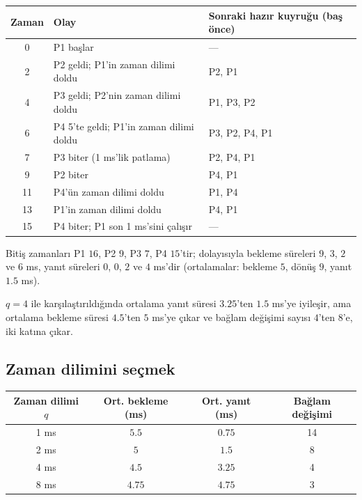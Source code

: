 \begin{center}
\renewcommand{\arraystretch}{1.15}
\begin{tabular}{@{}cll@{}}
\toprule
\textbf{Zaman} & \textbf{Olay} & \textbf{Sonraki hazır kuyruğu (baş önce)}\\
\midrule
0 & P1 başlar & --- \\
2 & P2 geldi; P1'in zaman dilimi doldu & P2, P1 \\
4 & P3 geldi; P2'nin zaman dilimi doldu & P1, P3, P2 \\
6 & P4 5'te geldi; P1'in zaman dilimi doldu & P3, P2, P4, P1 \\
7 & P3 biter (1 ms'lik patlama) & P2, P4, P1 \\
9 & P2 biter & P4, P1 \\
11 & P4'ün zaman dilimi doldu & P1, P4 \\
13 & P1'in zaman dilimi doldu & P4, P1 \\
15 & P4 biter; P1 son 1 ms'sini çalışır & --- \\
\bottomrule
\end{tabular}
\end{center}

Bitiş zamanları P1 $16$, P2 $9$, P3 $7$, P4 $15$'tir; dolayısıyla bekleme süreleri $9$, $3$, $2$ ve $6$ ms, yanıt süreleri $0$, $0$, $2$ ve $4$ ms'dir (ortalamalar: bekleme $5$, dönüş $9$, yanıt $1.5$ ms).

$q=4$ ile karşılaştırıldığında ortalama yanıt süresi $3.25$'ten $1.5$ ms'ye iyileşir, ama ortalama bekleme süresi $4.5$'ten $5$ ms'ye çıkar ve bağlam değişimi sayısı $4$'ten $8$'e, iki katına çıkar.

\subsection{Zaman dilimini seçmek}

\begin{center}
\renewcommand{\arraystretch}{1.2}
\begin{tabular}{@{}cccc@{}}
\toprule
\textbf{Zaman dilimi $q$} & \textbf{Ort. bekleme (ms)} & \textbf{Ort. yanıt (ms)} & \textbf{Bağlam değişimi}\\
\midrule
1 ms & $5.5$ & $0.75$ & 14\\
2 ms & $5$ & $1.5$ & 8\\
4 ms & $4.5$ & $3.25$ & 4\\
8 ms & $4.75$ & $4.75$ & 3\\
\bottomrule
\end{tabular}
\end{center}

